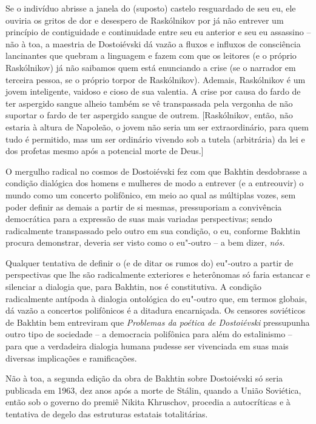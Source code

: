 Se o indivíduo abrisse a janela do (suposto) castelo resguardado de seu
eu, ele ouviria os gritos de dor e desespero de Raskólnikov por já não
entrever um princípio de contiguidade e continuidade entre seu eu
anterior e seu eu assassino -- não à toa, a maestria de Dostoiévski dá
vazão a fluxos e influxos de consciência lancinantes que quebram a
linguagem e fazem com que os leitores (e o próprio Raskólnikov) já não
saibamos quem está enunciando a crise (se o narrador em terceira pessoa,
se o próprio torpor de Raskólnikov). Ademais, Raskólnikov é um jovem
inteligente, vaidoso e cioso de sua valentia. A crise por causa do fardo
de ter aspergido sangue alheio também se vê transpassada pela vergonha
de não suportar o fardo de ter aspergido sangue de outrem.
{[}Raskólnikov, então, não estaria à altura de Napoleão, o jovem não
seria um ser extraordinário, para quem tudo é permitido, mas um ser
ordinário vivendo sob a tutela (arbitrária) da lei e dos profetas mesmo
após a potencial morte de Deus.{]}

O mergulho radical no cosmos de Dostoiévski fez com que Bakhtin
desdobrasse a condição dialógica dos homens e mulheres de modo a
entrever (e a entreouvir) o mundo como um concerto polifônico, em meio
ao qual as múltiplas vozes, sem poder definir as demais a partir de si
mesmas, pressuporiam a convivência democrática para a expressão de suas
mais variadas perspectivas; sendo radicalmente transpassado pelo outro
em sua condição, o eu, conforme Bakhtin procura demonstrar, deveria ser
visto como o eu"-outro -- a bem dizer, \emph{nós.}

Qualquer tentativa de definir o (e de ditar os rumos do) eu"-outro a
partir de perspectivas que lhe são radicalmente exteriores e heterônomas
só faria estancar e silenciar a dialogia que, para Bakhtin, nos é
constitutiva. A condição radicalmente antípoda à dialogia ontológica do
eu"-outro que, em termos globais, dá vazão a concertos polifônicos é a
ditadura encarniçada. Os censores soviéticos de Bakhtin bem entreviram
que \emph{Problemas da poética de Dostoiévski} pressupunha outro tipo de
sociedade -- a democracia polifônica para além do estalinismo -- para
que a verdadeira dialogia humana pudesse ser vivenciada em suas mais
diversas implicações e ramificações.

Não à toa, a segunda edição da obra de Bakhtin sobre Dostoiévski só
seria publicada em 1963, dez anos após a morte de Stálin, quando a União
Soviética, então sob o governo do premiê Nikita Khruschov, procedia a
autocríticas e à tentativa de degelo das estruturas estatais
totalitárias.

